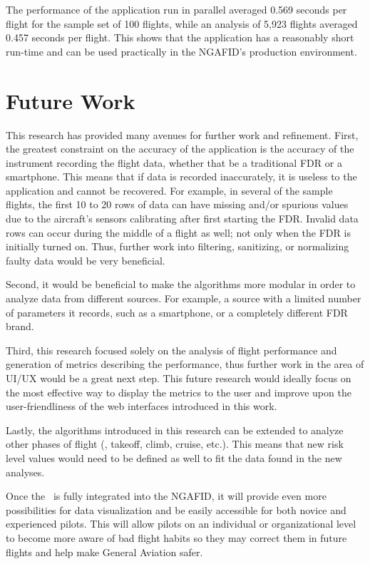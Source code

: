 	The performance of the application run in parallel averaged 0.569 seconds per flight for the sample set of 100 flights, while an analysis of 5,923 flights averaged 0.457 seconds per flight.  This shows that the application has a reasonably short run-time and can be used practically in the NGAFID's production environment.


\section{Future Work} \label{sec:future_work}

	This research has provided many avenues for further work and refinement.  First, the greatest constraint on the accuracy of the application is the accuracy of the instrument recording the flight data, whether that be a traditional FDR or a smartphone.  This means that if data is recorded inaccurately, it is useless to the application and cannot be recovered.  For example, in several of the sample flights, the first 10 to 20 rows of data can have missing and/or spurious values due to the aircraft's sensors calibrating after first starting the FDR.  Invalid data rows can occur during the middle of a flight as well; not only when the FDR is initially turned on.  Thus, further work into filtering, sanitizing, or normalizing faulty data would be very beneficial.
	
	Second, it would be beneficial to make the algorithms more modular in order to analyze data from different sources.  For example, a source with a limited number of parameters it records, such as a smartphone, or a completely different FDR brand.
	
	Third, this research focused solely on the analysis of flight performance and generation of metrics describing the performance, thus further work in the area of UI/UX would be a great next step.  This future research would ideally focus on the most effective way to display the metrics to the user and improve upon the user-friendliness of the web interfaces introduced in this work.
	
	Lastly, the algorithms introduced in this research can be extended to analyze other phases of flight (\eg, takeoff, climb, cruise, etc.).  This means that new risk level values would need to be defined as well to fit the data found in the new analyses.
    
    Once the \toolname\ is fully integrated into the NGAFID, it will provide even more possibilities for data visualization and be easily accessible for both novice and experienced pilots.  This will allow pilots on an individual or organizational level to become more aware of bad flight habits so they may correct them in future flights and help make General Aviation safer.
